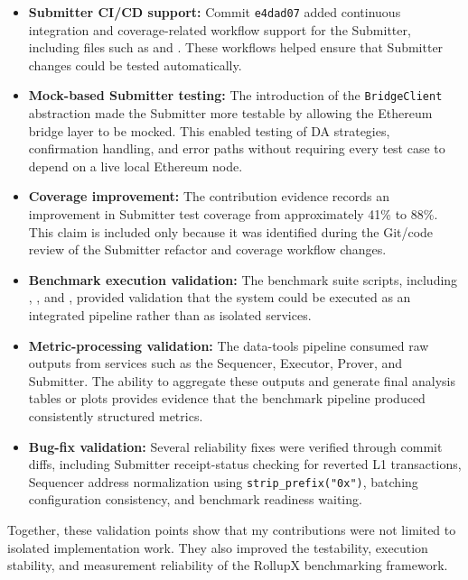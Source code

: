 \begin{itemize}
    \item \textbf{Submitter CI/CD support:} Commit \texttt{e4dad07} added continuous integration and coverage-related workflow support for the Submitter, including files such as  and . These workflows helped ensure that Submitter changes could be tested automatically.

    \item \textbf{Mock-based Submitter testing:} The introduction of the \texttt{BridgeClient} abstraction made the Submitter more testable by allowing the Ethereum bridge layer to be mocked. This enabled testing of DA strategies, confirmation handling, and error paths without requiring every test case to depend on a live local Ethereum node.

    \item \textbf{Coverage improvement:} The contribution evidence records an improvement in Submitter test coverage from approximately 41\% to 88\%. This claim is included only because it was identified during the Git/code review of the Submitter refactor and coverage workflow changes.

    \item \textbf{Benchmark execution validation:} The benchmark suite scripts, including , , and , provided validation that the system could be executed as an integrated pipeline rather than as isolated services.

    \item \textbf{Metric-processing validation:} The data-tools pipeline consumed raw outputs from services such as the Sequencer, Executor, Prover, and Submitter. The ability to aggregate these outputs and generate final analysis tables or plots provides evidence that the benchmark pipeline produced consistently structured metrics.

    \item \textbf{Bug-fix validation:} Several reliability fixes were verified through commit diffs, including Submitter receipt-status checking for reverted L1 transactions, Sequencer address normalization using \texttt{strip\_prefix("0x")}, batching configuration consistency, and benchmark readiness waiting.
\end{itemize}

Together, these validation points show that my contributions were not limited to isolated implementation work. They also improved the testability, execution stability, and measurement reliability of the RollupX benchmarking framework.

